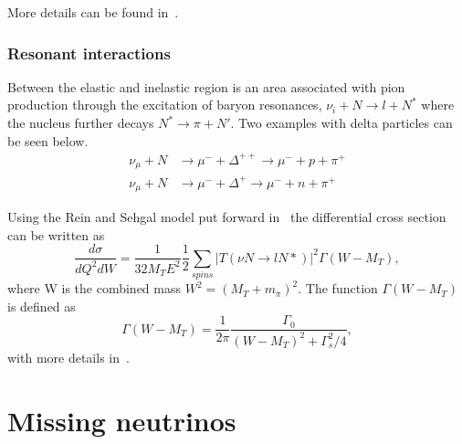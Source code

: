 More details can be found in~\cite{47Soler}.

\subsubsection{Resonant interactions}
Between the elastic and inelastic region is an area associated with pion production through the excitation of baryon resonances, $\nu_i + N \rightarrow l + N^*$ where the nucleus further decays $N^* \rightarrow \pi + N'$. Two examples with delta particles can be seen below.
\begin{align}
\nu_\mu + N &\rightarrow \mu^- + \Delta^{++} \rightarrow \mu^- + p + \pi^+\\
\nu_\mu + N &\rightarrow \mu^- + \Delta^{+} \rightarrow \mu^- + n + \pi^+
\end{align}

Using the Rein and Sehgal model put forward in~\cite{104REIN} the differential cross section can be written as
\begin{equation}
\frac{d\sigma}{dQ^2dW} = \frac{1}{32 M_T E^2}\frac{1}{2} \sum_{spins} |T(\nu N \rightarrow lN*)|^2 \Gamma (W-M_T),
\end{equation}
where W is the combined mass $W^2 = (M_T + m_\pi)^2$. The function $\Gamma(W-M_T)$ is defined as
\begin{equation}
\Gamma(W-M_T)=\frac{1}{2\pi}\frac{\Gamma_0}{(W-M_T)^2+\Gamma_s^2/4},
\end{equation}
with more details in~\cite{104REIN}.


\section{Missing neutrinos}\label{subsection:Missing}

